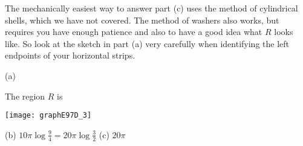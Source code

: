 \begin{hint}
The mechanically easiest way to answer part (c) uses the method of cylindrical
shells, which we have not covered.  The method of washers also works, but requires  you have enough patience and also
to have a good idea what $R$ looks like. So look at the sketch in part
(a) very carefully when identifying the left endpoints of your horizontal strips.
\end{hint}

\begin{answer} (a)

The region $R$ is

\begin{center}
       \texttt{[image: graphE97D\_3]}
\end{center}


\noindent(b)
$\displaystyle10\pi\log\frac{9}{4}=20\pi\log\frac{3}{2}$
\qquad (c)
 $20\pi$
\end{answer}

